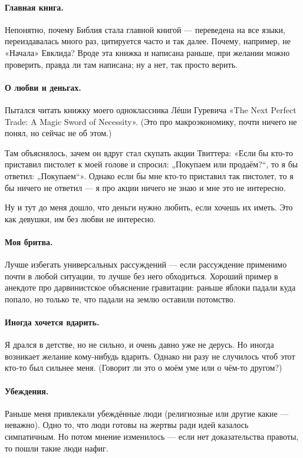 \documentclass{book}
\begin{document}
\paragraph{Главная книга.}
Непонятно, почему Библия стала главной книгой --- переведена на все языки, переиздавалась много раз, цитируется часто и так далее.
Почему, например, не «Начала» Евклида?
Вроде эта книжка и написана раньше, при желании можно проверить, правда ли там написана;
ну а нет, так просто верить.

\paragraph{О любви и деньгах.}
Пытался читать книжку моего одноклассника Лёши Гуревича «The Next Perfect Trade: A Magic Sword of Necessity».
(Это про макроэкономику, почти ничего не понял, но сейчас не об этом.)

Там объяснялось, зачем он вдруг стал скупать акции Твиттера: «Если бы кто-то приставил пистолет к моей голове и спросил: „Покупаем или продаём?“, то я бы ответил: „Покупаем“».
Однако если бы мне кто-то приставил так пистолет, то я бы ничего не ответил --- я про акции ничего не знаю и мне это не интересно.

Ну и тут до меня дошло, что деньги нужно любить, если хочешь их иметь.
Это как девушки, им без любви не интересно. 

\paragraph{Моя бритва.}
Лучше избегать универсальных рассуждений --- если рассуждение применимо почти в любой ситуации, то лучше без него обходиться.
Хороший пример в анекдоте про дарвинистское объяснение гравитации: раньше яблоки падали куда попало, но только те, что падали на землю оставили потомство.

\paragraph{Иногда хочется вдарить.}
Я дрался в детстве, но не сильно, и очень давно уже не дерусь.
Но иногда возникает желание кому-нибудь вдарить.
Однако ни разу не случилось чтоб этот кто-то был сильнее меня.
(Говорит ли это о моём уме или о чём-то другом?)

\paragraph{Убеждения.}
Раньше меня привлекали убеждённые люди (религиозные или другие какие --- неважно).
Одно то, что люди готовы на жертвы ради идей казалось симпатичным.
Но потом мнение изменилось --- если нет доказательства правоты, то пошли такие люди нафиг.
\end{document}
